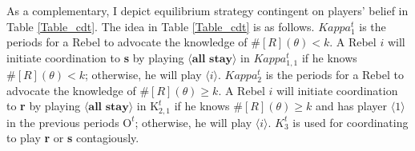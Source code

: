 \documentclass[12pt,letter]{article}
\newcommand{\Kappa}{\mathrm{K}}
\newcommand{\Omicron}{\mathrm{O}}
\theoremstyle{definition}
\theoremstyle{remark}
\theoremstyle{claim}
\begin{document}
As a complementary, I depict equilibrium strategy contingent on players' belief in Table \ref{Table_cdt}. The idea in Table \ref{Table_cdt} is as follows. $Kappa^t_1$ is the periods for a Rebel to advocate the knowledge of $\# [R](\theta)<k$. A Rebel $i$ will initiate coordination to \textbf{s} by playing $\langle \textbf{all stay} \rangle$ in $Kappa^t_{1,1}$ if he knows $\# [R](\theta)<k$; otherwise, he will play $\langle i \rangle$. $Kappa^t_2$ is the periods for a Rebel to advocate the knowledge of $\# [R](\theta)\geq k$. A Rebel $i$ will initiate coordination to \textbf{r} by playing $\langle \textbf{all stay} \rangle$ in $\Kappa^t_{2,1}$ if he knows $\# [R](\theta)\geq k$ and has player $\langle 1 \rangle$ in the previous periods $\Omicron^t$; otherwise, he will play $\langle i \rangle$. $K^t_3$ is used for coordinating to play \textbf{r} or \textbf{s} contagiously.
\end{document}
